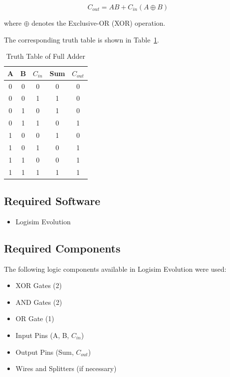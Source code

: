 \documentclass[12pt,a4paper]{article}
\begin{document}
\begin{equation}
C_{out}=AB+C_{in}(A\oplus B)
\end{equation}

where $\oplus$ denotes the Exclusive-OR (XOR) operation.

The corresponding truth table is shown in Table~\ref{tab:fa_truth}.

\begin{table}[H]
\centering
\caption{Truth Table of Full Adder}
\label{tab:fa_truth}
\begin{tabular}{|c|c|c|c|c|}
\hline
\textbf{A} & \textbf{B} & \textbf{$C_{in}$} & \textbf{Sum} & \textbf{$C_{out}$}\\
\hline
0 & 0 & 0 & 0 & 0\\
0 & 0 & 1 & 1 & 0\\
0 & 1 & 0 & 1 & 0\\
0 & 1 & 1 & 0 & 1\\
1 & 0 & 0 & 1 & 0\\
1 & 0 & 1 & 0 & 1\\
1 & 1 & 0 & 0 & 1\\
1 & 1 & 1 & 1 & 1\\
\hline
\end{tabular}
\end{table}

\subsection*{Required Software}

\begin{itemize}
    \item Logisim Evolution
\end{itemize}

\subsection*{Required Components}

The following logic components available in Logisim Evolution were used:

\begin{itemize}
    \item XOR Gates (2)
    \item AND Gates (2)
    \item OR Gate (1)
    \item Input Pins (A, B, $C_{in}$)
    \item Output Pins (Sum, $C_{out}$)
    \item Wires and Splitters (if necessary)
\end{itemize}
\end{document}
